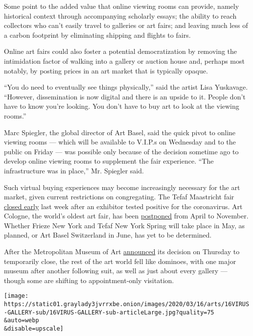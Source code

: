 Some point to the added value that online viewing rooms can provide,
namely historical context through accompanying scholarly essays; the
ability to reach collectors who can't easily travel to galleries or art
fairs; and leaving much less of a carbon footprint by eliminating
shipping and flights to fairs.

Online art fairs could also foster a potential democratization by
removing the intimidation factor of walking into a gallery or auction
house and, perhaps most notably, by posting prices in an art market that
is typically opaque.

``You do need to eventually see things physically,'' said the artist
Lisa Yuskavage. ``However, dissemination is now digital and there is an
upside to it. People don't have to know you're looking. You don't have
to buy art to look at the viewing rooms.''

Marc Spiegler, the global director of Art Basel, said the quick pivot to
online viewing rooms --- which will be available to V.I.P.s on Wednesday
and to the public on Friday --- was possible only because of the
decision sometime ago to develop online viewing rooms to supplement the
fair experience. ``The infrastructure was in place,'' Mr. Spiegler said.

Such virtual buying experiences may become increasingly necessary for
the art market, given current restrictions on congregating. The Tefaf
Maastricht fair
\href{https://news.artnet.com/market/tefaf-shuts-maastrich-coronavirus-concerns-1800198}{closed
early} last week after an exhibitor tested positive for the coronavirus.
Art Cologne, the world's oldest art fair, has been
\href{https://www.theartnewspaper.com/news/art-cologne-postponed-from-april-to-november}{postponed}
from April to November. Whether Frieze New York and Tefaf New York
Spring will take place in May, as planned, or Art Basel Switzerland in
June, has yet to be determined.

After the Metropolitan Museum of Art
\href{https://www.nytimes3xbfgragh.onion/2020/03/12/arts/design/met-museum-opera-carnegie-hall-close-coronavirus.html}{announced}
its decision on Thursday to temporarily close, the rest of the art world
fell like dominoes, with one major museum after another following suit,
as well as just about every gallery --- though some are shifting to
appointment-only visitation.

\texttt{[image: https://static01.graylady3jvrrxbe.onion/images/2020/03/16/arts/16VIRUS-GALLERY-sub/16VIRUS-GALLERY-sub-articleLarge.jpg?quality=75\\\&auto=webp\\\&disable=upscale]}

